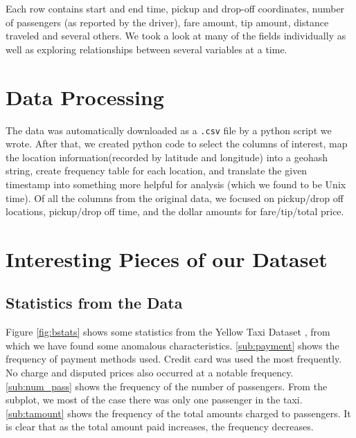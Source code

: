 \documentclass{article}
\begin{document}
Each row contains start and end time, pickup and drop-off coordinates, number of passengers (as reported by the driver), fare amount, tip amount, distance traveled and several others. We took a look at many of the fields individually as well as exploring relationships between several variables at a time.


\section{Data Processing}
The data was automatically downloaded as a {\tt .csv} file by a python script we wrote. After that, we created python code to select the columns of interest, map the location information(recorded by latitude and longitude) into a geohash string, create frequency table for each location, and translate the given timestamp into something more helpful for analysis (which we found to be Unix time). Of all the columns from the original data, we focused on pickup/drop off locations, pickup/drop off time, and the dollar amounts for fare/tip/total price. 


\section{Interesting Pieces of our Dataset}
\subsection{Statistics from the Data}
Figure \ref{fig:bstats} shows some statistics from the Yellow Taxi Dataset \cite{dataset}, from which we have found some anomalous characteristics. \ref{sub:payment} shows the frequency of payment methods used. Credit card was used the most frequently. No charge and disputed prices also occurred at a notable frequency. \ref{sub:num_pass} shows the frequency of the number of passengers. From the subplot, we most of the case there was only one passenger in the taxi. \ref{sub:tamount} shows the frequency of the total amounts charged to passengers. It is clear that as the total amount paid increases, the frequency decreases.
\end{document}
